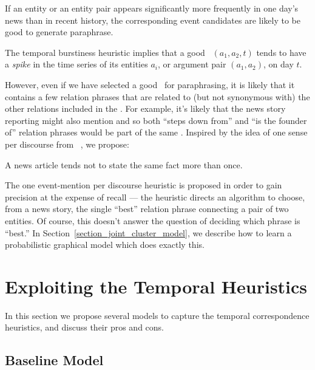 \begin{H2}
	\label{hypo_two}
If an entity or an entity pair appears significantly more frequently
in one day's news than in recent history, the corresponding event
candidates are likely to be good to generate paraphrase.
\end{H2}

The temporal burstiness heuristic implies that a good
\eec\ $(a_1,a_2,t)$ tends to have a {\em spike} in the time series of
its entities $a_i$, or argument pair $(a_1,a_2)$, on day $t$.

However, even if we have selected a good \eec\ for paraphrasing,
it is likely that it contains a few relation phrases that are related to
(but not synonymous with) the other relations included in the
\eec. For example, it's likely that the news story reporting
 might also mention
 and so both ``steps
down from'' and ``is the founder of'' relation phrases would be part
of the same \bag.  Inspired by the idea of one sense per discourse
from ~\cite{gale1992one}, we propose:

\begin{H3}
	\label{hypo_three}
A news article tends not to state the same fact more than once.
\end{H3}


The one event-mention per discourse heuristic is proposed in order to gain
precision at the expense of recall --- the heuristic directs an algorithm
to choose, from a news story, the single ``best'' relation phrase
connecting a pair of two entities.  Of course, this doesn't answer the
question of deciding which phrase is ``best.''  In
Section~\ref{section_joint_cluster_model}, we describe how to learn a
probabilistic graphical model which does exactly this.


\section{Exploiting the Temporal Heuristics}
\label{section_model}

In this section we propose several models to capture the temporal
correspondence heuristics, and discuss their pros and cons.

\subsection{Baseline Model}
\label{section_basic_model}

